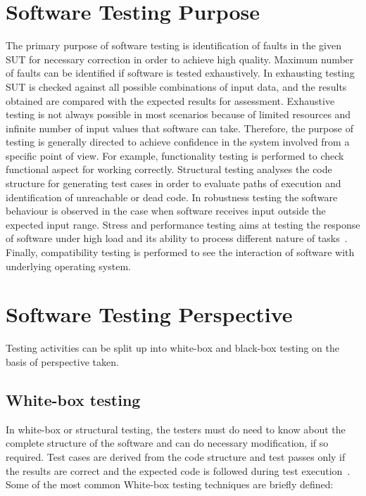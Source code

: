 {\section{Software Testing Purpose}
The primary purpose of software testing is identification of faults in the given SUT for necessary correction in order to achieve high quality. Maximum number of faults can be identified if software is tested exhaustively. In exhausting testing SUT is checked against all possible combinations of input data, and the results obtained are compared with the expected results for assessment. Exhaustive testing is not always possible in most scenarios because of limited resources and infinite number of input values that software can take. Therefore, the purpose of testing is generally directed to achieve confidence in the system involved from a specific point of view. For example, functionality testing is performed to check functional aspect for working correctly. Structural testing analyses the code structure for generating test cases in order to evaluate paths of execution and identification of unreachable or dead code. In robustness testing the software behaviour is observed in the case when software receives input outside the expected input range. Stress and performance testing aims at testing the response of software under high load and its ability to process different nature of tasks~\cite{cohen2005robustness}. Finally, compatibility testing is performed to see the interaction of software with underlying operating system.

\section{Software Testing Perspective}
Testing activities can be split up into white-box and black-box testing on the basis of perspective taken. 

\subsection{White-box testing}
In white-box or structural testing, the testers must do need to know about the complete structure of the software and can do necessary modification, if so required. Test cases are derived from the code structure and test passes only if the results are correct and the expected code is followed during test execution~\cite{ostrand2002white}. Some of the most common White-box testing techniques are briefly defined:

}
